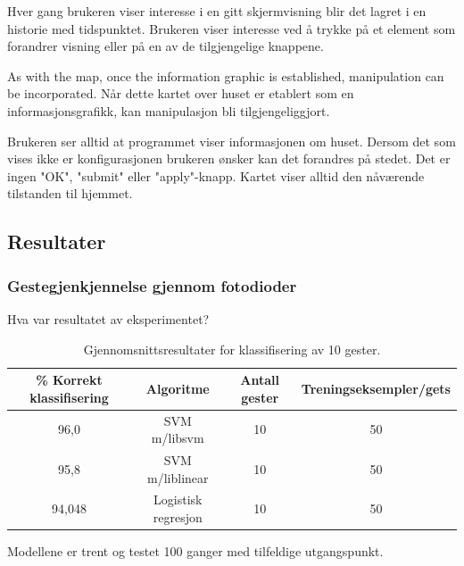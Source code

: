 Hver gang brukeren viser interesse i en gitt skjermvisning blir det lagret i en historie med tidspunktet. Brukeren viser interesse ved å trykke på et element som forandrer visning eller på en av de tilgjengelige knappene.

As with the map, once the information graphic is established, manipulation can be incorporated.
Når dette kartet over huset er etablert som en informasjonsgrafikk, kan manipulasjon bli tilgjengeliggjort.

Brukeren ser alltid at programmet viser informasjonen om huset. Dersom det som vises ikke er konfigurasjonen brukeren ønsker kan det forandres på stedet. Det er ingen "OK", "submit" eller "apply"-knapp. Kartet viser alltid den nåværende tilstanden til hjemmet.




\subsection{Resultater}
\subsubsection{Gestegjenkjennelse gjennom fotodioder}
{\color{red}Hva var resultatet av eksperimentet?}

\begin{table}[h!]
\centering
\begin{tabular}{|| c c c c ||}
\hline
\% Korrekt klassifisering & Algoritme & Antall gester & Treningseksempler/gets \\ [0.5ex] 
 \hline\hline
 96,0 & SVM m/libsvm & 10 & 50 \\ 
 \hline
 95,8 & SVM m/liblinear & 10 & 50 \\
 \hline
 94,048 & Logistisk regresjon & 10 & 50 \\ [1ex]
 \hline
\end{tabular}
\caption{Gjennomsnittsresultater for klassifisering av 10 gester.}
\label{table:results}
\end{table}

Modellene er trent og testet 100 ganger med tilfeldige utgangspunkt.

